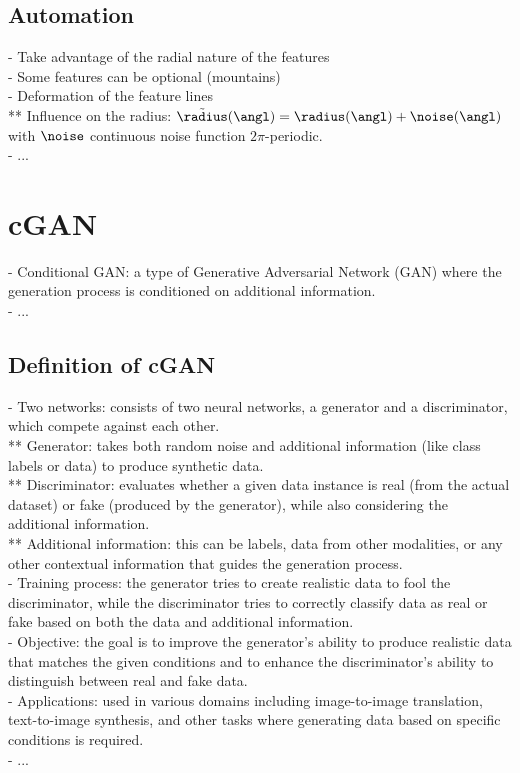 \subsection{Automation}
- Take advantage of the radial nature of the features \\
- Some features can be optional (mountains) \\
- Deformation of the feature lines \\ 
** Influence on the radius: $\Tilde \radius(\angl) = \radius(\angl) + \noise(\angl)$ with $\noise$ continuous noise function $2\pi$-periodic. \\
- ...

\section{cGAN}
\label{sec:coral-island_cGAN}
- Conditional GAN: a type of Generative Adversarial Network (GAN) where the generation process is conditioned on additional information. \\
- ...

\subsection{Definition of cGAN}
- Two networks: consists of two neural networks, a generator and a discriminator, which compete against each other. \\
** Generator: takes both random noise and additional information (like class labels or data) to produce synthetic data. \\
** Discriminator: evaluates whether a given data instance is real (from the actual dataset) or fake (produced by the generator), while also considering the additional information. \\
** Additional information: this can be labels, data from other modalities, or any other contextual information that guides the generation process. \\
- Training process: the generator tries to create realistic data to fool the discriminator, while the discriminator tries to correctly classify data as real or fake based on both the data and additional information. \\
- Objective: the goal is to improve the generator's ability to produce realistic data that matches the given conditions and to enhance the discriminator's ability to distinguish between real and fake data. \\
- Applications: used in various domains including image-to-image translation, text-to-image synthesis, and other tasks where generating data based on specific conditions is required. \\
- ...

